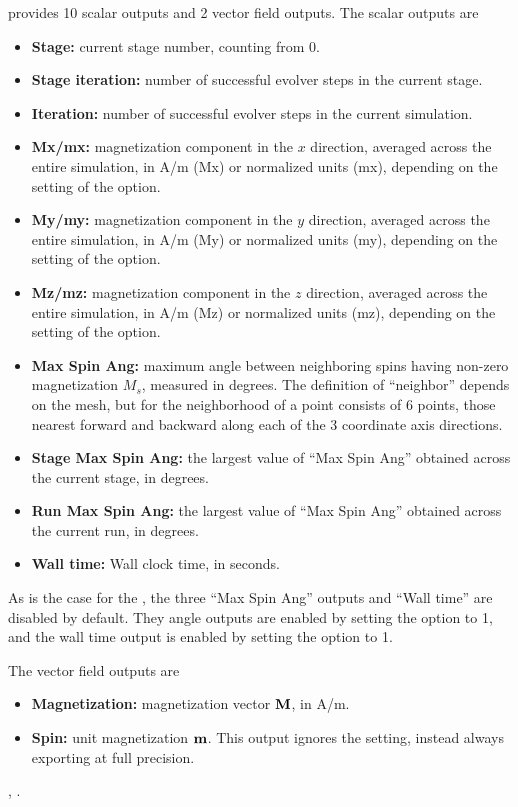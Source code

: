 \begin{description}
 provides 10 scalar outputs and 2 vector
field outputs.  The scalar outputs are
\begin{itemize}
\item \textbf{Stage:} current stage number, counting from 0.
\item \textbf{Stage iteration:} number of successful evolver steps
in the current stage.
\item \textbf{Iteration:} number of successful evolver steps in the
current simulation.
\item \textbf{Mx/mx:} magnetization component in the $x$ direction,
averaged across the entire simulation, in A/m (Mx) or normalized units
(mx), depending on the setting of the 
option.
\item \textbf{My/my:} magnetization component in the $y$ direction,
averaged across the entire simulation, in A/m (My) or normalized units
(my), depending on the setting of the 
option.
\item \textbf{Mz/mz:} magnetization component in the $z$ direction,
averaged across the entire simulation, in A/m (Mz) or normalized units
(mz), depending on the setting of the 
option.
\item \textbf{Max Spin Ang:} maximum angle between neighboring spins
having non-zero magnetization $M_s$, measured in degrees.  The definition
of ``neighbor'' depends on the mesh, but for 
the neighborhood of a point consists of 6 points, those nearest
forward and backward along each of the 3 coordinate axis directions.
\item \textbf{Stage Max Spin Ang:} the largest value of ``Max Spin
Ang'' obtained across the current stage, in degrees.
\item \textbf{Run Max Spin Ang:} the largest value of ``Max Spin
Ang'' obtained across the current run, in degrees.
\item \textbf{Wall time:} Wall clock time, in seconds.
\end{itemize}
As is the case for the , the three ``Max Spin Ang''
outputs and ``Wall time'' are disabled by default.  They angle outputs
are enabled by setting the  option to
1, and the wall time output is enabled by setting the
 option to 1.

The vector field outputs are
\begin{itemize}
\item \textbf{Magnetization:} magnetization vector $\textbf{M}$, in A/m.
\item \textbf{Spin:} unit magnetization $\textbf{m}$.  This output ignores the
  setting, instead
always exporting at full precision.
\end{itemize}

\begin{ExampleMifs}
  , .
\end{ExampleMifs}

\end{description}

